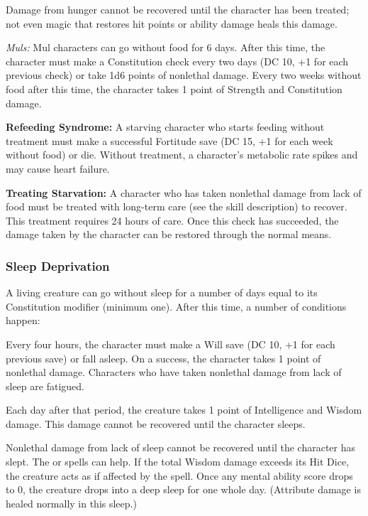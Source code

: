 Damage from hunger cannot be recovered until the character has been treated; not even magic that restores hit points or ability damage heals this damage.

\textit{Muls:} Mul characters can go without food for 6 days. After this time, the character must make a Constitution check every two days (DC 10, +1 for each previous check) or take 1d6 points of nonlethal damage. Every two weeks without food after this time, the character takes 1 point of Strength and Constitution damage.

\textbf{Refeeding Syndrome:} A starving character who starts feeding without treatment must make a successful Fortitude save (DC 15, +1 for each week without food) or die. Without treatment, a character's metabolic rate spikes and may cause heart failure.

\textbf{Treating Starvation:} A character who has taken nonlethal damage from lack of food must be treated with long-term care (see the  skill description) to recover. This treatment requires 24 hours of care. Once this  check has succeeded, the damage taken by the character can be restored through the normal means.

\subsubsection{Sleep Deprivation}
A living creature can go without sleep for a number of days equal to its Constitution modifier (minimum one). After this time, a number of conditions happen:
\begin{itemize*}
\item Every four hours, the character must make a Will save (DC 10, +1 for each previous save) or fall asleep. On a success, the character takes 1 point of nonlethal damage. Characters who have taken nonlethal damage from lack of sleep are fatigued.
\item Each day after that period, the creature takes 1 point of Intelligence and Wisdom damage. This damage cannot be recovered until the character sleeps.
\end{itemize*}

Nonlethal damage from lack of sleep cannot be recovered until the character has slept. The  or  spells can help. If the total Wisdom damage exceeds its Hit Dice, the creature acts as if affected by the  spell. Once any mental ability score drops to 0, the creature drops into a deep sleep for one whole day. (Attribute damage is healed normally in this sleep.)

